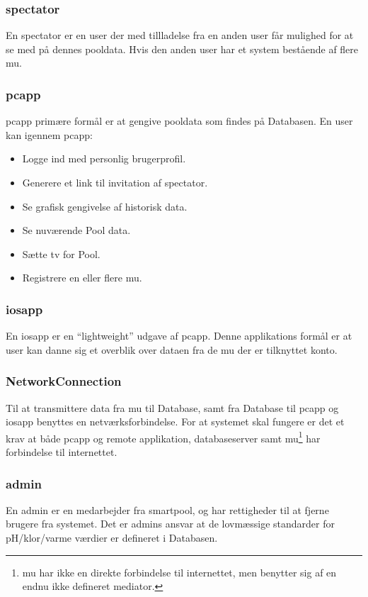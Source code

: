 
\subsubsection{\Gls{spectator}}
En \gls{spectator} er en \gls{user} der med tillladelse fra en anden \gls{user} får mulighed for at se med på dennes pooldata. Hvis den anden \gls{user} har et system bestående af flere \gls{mu}.

\subsubsection{\gls{pcapp}}
\gls{pcapp} primære formål er at gengive pooldata som findes på Databasen. En \gls{user} kan igennem \gls{pcapp}:

\begin{itemize}
	\item Logge ind med personlig brugerprofil.
	\item Generere et link til invitation af \gls{spectator}.
	\item Se grafisk gengivelse af historisk data.
	\item Se nuværende Pool data.
	\item Sætte \gls{tv} for Pool.
	\item Registrere en eller flere \gls{mu}.
\end{itemize}

\subsubsection{\gls{iosapp}}
En \gls{iosapp} er en “lightweight” udgave af \gls{pcapp}. Denne applikations formål er at \gls{user} kan danne sig et overblik over dataen fra de \gls{mu} der er tilknyttet konto.

\subsubsection{NetworkConnection}
Til at transmittere data fra \gls{mu} til Database, samt fra Database til \gls{pcapp} og \gls{iosapp} benyttes en netværksforbindelse.  For at systemet skal fungere er det et krav at både \gls{pcapp} og remote applikation, databaseserver samt \gls{mu}\footnote{\gls{mu} har ikke en direkte forbindelse til internettet, men benytter sig af en endnu ikke defineret mediator.} har forbindelse til internettet.

\subsubsection{\gls{admin}}
En \gls{admin} er en medarbejder fra \gls{smartpool}, og har rettigheder til at fjerne brugere fra systemet. Det er \glspl{admin} ansvar at de lovmæssige standarder  for pH/klor/varme værdier er defineret i Databasen.

